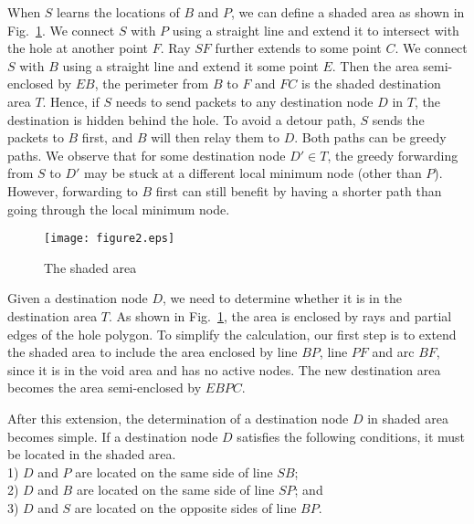 \documentclass[3p,times]{elsarticle}
\begin{document}
When $S$ learns the locations of $B$ and $P$, we can define a shaded area as shown in Fig.~\ref{fig2}.
We connect $S$ with $P$ using a straight line and extend it to intersect with the hole at another point $F$.
Ray $SF$ further extends to some point $C$.
We connect $S$ with $B$ using a straight line and extend it some point $E$.
Then the area semi-enclosed by $EB$, the perimeter from $B$ to $F$ and $FC$ is the
shaded destination area $T$.
Hence, if $S$ needs to send packets to any destination node $D$ in $T$,
the destination is hidden behind the hole.
To avoid a detour path, $S$ sends the packets to $B$ first, and $B$ will then relay them to $D$.
Both paths can be greedy paths.
We observe that for some destination node $D' \in T$, the greedy forwarding from $S$ to $D'$ may
be stuck at a different local minimum node (other than $P$). However, forwarding to $B$ first
can still benefit by having a shorter path than going through the local minimum node.

\begin{figure}[!htp]
\begin{center}
\texttt{[image: figure2.eps]}
\end{center}
\caption{The shaded area}
\label{fig2}
\end{figure}






Given a destination node $D$, we need to determine whether it is in the destination area $T$.
As shown in Fig.~\ref{fig2}, the area is enclosed by rays and partial edges of the hole polygon.
To simplify the calculation, our first step is to extend the shaded area to include
the area enclosed by line $BP$, line $PF$ and arc $BF$,
since it is in the void area and has no active nodes.
The new destination area becomes the area semi-enclosed by $EBPC$.

After this extension, the determination of a destination node $D$ in shaded area becomes simple.
If a destination node $D$ satisfies the following conditions, it must be located in the shaded area. \\

\text{} 1) $D$ and $P$ are located on the same side of line $SB$;\\
\text{~~~~~~} 2) $D$ and $B$ are located on the same side of line $SP$; and \\
\text{~~~~~~} 3) $D$ and $S$ are located on the opposite sides of line $BP$.

\vspace{0.1in}
\end{document}

